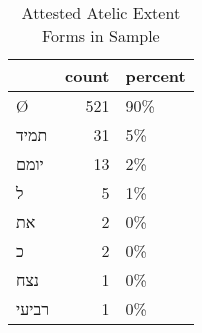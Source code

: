 \begin{table}[htbp!]
\centering
\caption{Attested Atelic Extent Forms in Sample}
\label{table:atel_front}
\begin{tabular}{lrl}
\toprule
{} &  count & percent \\
\midrule
\texthebrew{Ø}     &    521 &     90\% \\
\texthebrew{תמיד}  &     31 &      5\% \\
\texthebrew{יומם}  &     13 &      2\% \\
\texthebrew{ל}     &      5 &      1\% \\
\texthebrew{את}    &      2 &      0\% \\
\texthebrew{כ}     &      2 &      0\% \\
\texthebrew{נצח}   &      1 &      0\% \\
\texthebrew{רביעי} &      1 &      0\% \\
\bottomrule
\end{tabular}
\end{table}
